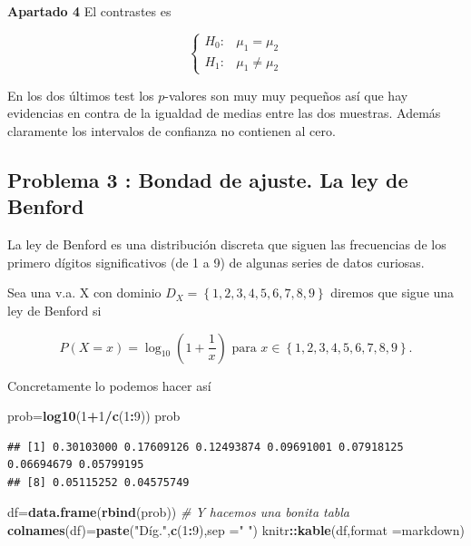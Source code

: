 \documentclass[
]{article}
\newenvironment{Shaded}{\begin{snugshade}}{\end{snugshade}}
\newcommand{\CommentTok}[1]{\textcolor[rgb]{0.56,0.35,0.01}{\textit{#1}}}
\newcommand{\DataTypeTok}[1]{\textcolor[rgb]{0.13,0.29,0.53}{#1}}
\newcommand{\DecValTok}[1]{\textcolor[rgb]{0.00,0.00,0.81}{#1}}
\newcommand{\KeywordTok}[1]{\textcolor[rgb]{0.13,0.29,0.53}{\textbf{#1}}}
\newcommand{\NormalTok}[1]{#1}
\newcommand{\OperatorTok}[1]{\textcolor[rgb]{0.81,0.36,0.00}{\textbf{#1}}}
\newcommand{\StringTok}[1]{\textcolor[rgb]{0.31,0.60,0.02}{#1}}
\begin{document}
\textbf{Apartado 4} El contrastes es

\[\left\{\begin{array}{ll}H_0: & \mu_1=\mu_2\\ H_1: & \mu_1\not=\mu_2\end{array}\right.
\]

En los dos últimos test los \(p\)-valores son muy muy pequeños así que
hay evidencias en contra de la igualdad de medias entre las dos
muestras. Además claramente los intervalos de confianza no contienen al
cero.

\hypertarget{problema-3-bondad-de-ajuste.-la-ley-de-benford}{%
\subsection{Problema 3 : Bondad de ajuste. La ley de
Benford}\label{problema-3-bondad-de-ajuste.-la-ley-de-benford}}

La ley de Benford es una distribución discreta que siguen las
frecuencias de los primero dígitos significativos (de 1 a 9) de algunas
series de datos curiosas.

Sea una v.a. X con dominio \(D_X=\left\{1,2,3,4,5,6,7,8,9\right\}\)
diremos que sigue una ley de Benford si

\[P(X=x)=\log_{10} \left(1+\frac{1}{x}\right)\mbox{ para } x\in \left\{1,2,3,4,5,6,7,8,9\right\}.\]

Concretamente lo podemos hacer así

\begin{Shaded}
\begin{Highlighting}[]
\NormalTok{prob=}\KeywordTok{log10}\NormalTok{(}\DecValTok{1}\OperatorTok{+}\DecValTok{1}\OperatorTok{/}\KeywordTok{c}\NormalTok{(}\DecValTok{1}\OperatorTok{:}\DecValTok{9}\NormalTok{))}
\NormalTok{prob}
\end{Highlighting}
\end{Shaded}

\begin{verbatim}
## [1] 0.30103000 0.17609126 0.12493874 0.09691001 0.07918125 0.06694679 0.05799195
## [8] 0.05115252 0.04575749
\end{verbatim}

\begin{Shaded}
\begin{Highlighting}[]
\NormalTok{df=}\KeywordTok{data.frame}\NormalTok{(}\KeywordTok{rbind}\NormalTok{(prob))}
\CommentTok{\# Y hacemos una bonita tabla}
\KeywordTok{colnames}\NormalTok{(df)=}\KeywordTok{paste}\NormalTok{(}\StringTok{"Díg."}\NormalTok{,}\KeywordTok{c}\NormalTok{(}\DecValTok{1}\OperatorTok{:}\DecValTok{9}\NormalTok{),}\DataTypeTok{sep =}\StringTok{" "}\NormalTok{)}
\NormalTok{knitr}\OperatorTok{::}\KeywordTok{kable}\NormalTok{(df,}\DataTypeTok{format =}\StringTok{\textquotesingle{}markdown\textquotesingle{}}\NormalTok{)}
\end{Highlighting}
\end{Shaded}
\end{document}
